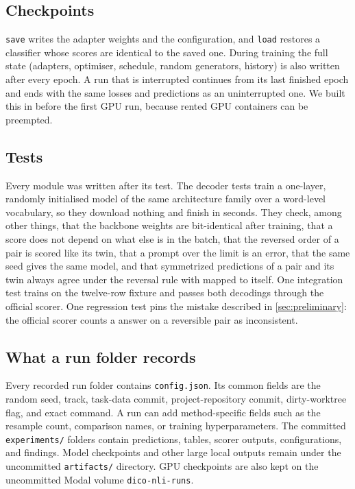 \subsection{Checkpoints}
\texttt{save} writes the adapter weights and the configuration, and \texttt{load} restores a classifier whose scores are identical to the saved one. During training the full state (adapters, optimiser, schedule, random generators, history) is also written after every epoch. A run that is interrupted continues from its last finished epoch and ends with the same losses and predictions as an uninterrupted one. We built this in before the first GPU run, because rented GPU containers can be preempted.

\subsection{Tests}
Every module was written after its test. The decoder tests train a one-layer, randomly initialised model of the same architecture family over a word-level vocabulary, so they download nothing and finish in seconds. They check, among other things, that the backbone weights are bit-identical after training, that a score does not depend on what else is in the batch, that the reversed order of a pair is scored like its twin, that a prompt over the limit is an error, that the same seed gives the same model, and that symmetrized predictions of a pair and its twin always agree under the reversal rule with \NO{} mapped to itself. One integration test trains on the twelve-row fixture and passes both decodings through the official scorer. One regression test pins the mistake described in \cref{sec:preliminary}: the official scorer counts a \NO{} answer on a reversible pair as inconsistent.


\subsection{What a run folder records}
Every recorded run folder contains \texttt{config.json}. Its common fields are the random
seed, track, task-data commit, project-repository commit, dirty-worktree flag, and exact
command. A run can add method-specific fields such as the resample count, comparison names,
or training hyperparameters. The committed \texttt{experiments/} folders contain predictions,
tables, scorer outputs, configurations, and findings. Model checkpoints and other large local
outputs remain under the uncommitted \texttt{artifacts/} directory. GPU checkpoints are also
kept on the uncommitted Modal volume \texttt{dico-nli-runs}.


